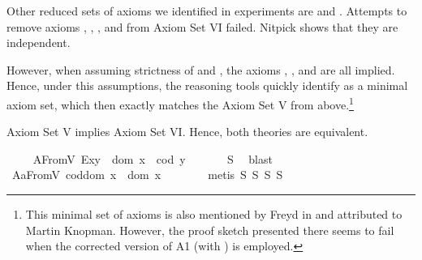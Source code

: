 \begin{isabellebody}
\begin{isamarkuptext}
   Other reduced sets of axioms we identified in experiments are  and
    . Attempts to remove axioms , , 
    , and  from Axiom Set VI failed. Nitpick shows that they are independent. 

   However, when assuming strictness of  and , the axioms , 
   ,  and  are all implied. Hence, under this 
   assumptions, the reasoning tools quickly identify  as a minimal axiom 
   set, which then exactly matches the Axiom Set V from above.\footnote{This minimal set of axioms 
   is also mentioned by Freyd in \cite{Freyd16} and attributed to Martin Knopman. However, the proof
   sketch presented there seems to fail when the corrected version of A1 (with \isa{{\isasymsimeq}}) is employed.}%
\end{isamarkuptext}\isamarkuptrue%
%
\begin{isamarkuptext}%
Axiom Set V implies Axiom Set VI. Hence, both theories are equivalent.%
\end{isamarkuptext}\isamarkuptrue%
\isanewline
\ \ \isamarkupfalse%
\ \ A{}FromV{\isacharcolon}\ {\isachardoublequoteopen}E{\isacharparenleft}x{\isasymcdot}y{\isacharparenright}\ \isactrlbold {\isasymleftrightarrow}\ dom\ x\ {\isasymsimeq}\ cod\ y{\isachardoublequoteclose}\ \isanewline
%
\isadelimproof
\ \ \ \ %
\endisadelimproof
%
\isatagproof
{}\isamarkupfalse%
\ S{}\ \isamarkupfalse%
\ blast%
\endisatagproof
{\isafoldproof}%
%
\isadelimproof
\isanewline
%
\endisadelimproof
\ \ \isamarkupfalse%
\ A{}aFromV{\isacharcolon}\ {\isachardoublequoteopen}cod{\isacharparenleft}dom\ x{\isacharparenright}\ {\isasymcong}\ dom\ x{\isachardoublequoteclose}\ \ \isanewline
%
\isadelimproof
\ \ \ \ %
\endisadelimproof
%
\isatagproof
{}\isamarkupfalse%
\ {\isacharparenleft}metis\ S{}\ S{}\ S{}\ S{}{\isacharparenright}%
\endisatagproof
{\isafoldproof}%
%
\isadelimproof

\end{isabellebody}
